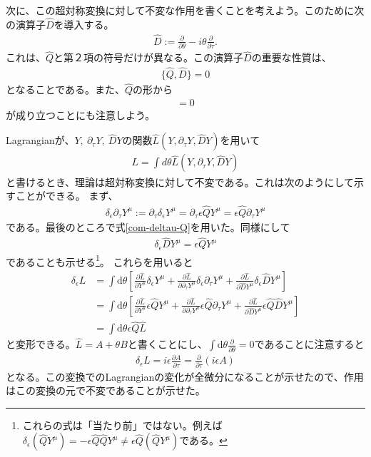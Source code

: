 \documentclass[report,paper=a4, fontsize=12pt, line_length=16cm, number_of_lines=33,dvipdfmx]{jlreq}
\numberwithin{equation}{chapter}
\numberwithin{equation}{section}
\newcommand{\del}{\partial}
\newcommand{\deldel}[2]{\frac{\del {#1}}{\del {#2}}}
\newcommand{\Qh}{\widehat{Q}}
\newcommand{\Dh}{\widehat{D}}
\newcommand{\Lh}{\widehat{L}}
\newcommand{\di}{\mathrm{d}}
\begin{document}
次に、この超対称変換に対して不変な作用を書くことを考えよう。このために次の演算子$\Dh$を導入する。
\begin{align}
\Dh:=\deldel{}{\theta}-i\theta\deldel{}{\tau}.
\end{align}
これは、$\Qh$と第２項の符号だけが異なる。この演算子$\Dh$の重要な性質は、
\begin{align}
\{\Qh,\Dh\}=0 \label{com-Q-D}
\end{align}
となることである。また、$\Qh$の形から
\begin{align}
[\del_{\tau},\Qh]=0\label{com-deltau-Q}
\end{align}
が成り立つことにも注意しよう。

Lagrangianが、$Y,\ \del_{\tau}Y,\ \Dh Y$の関数$\Lh(Y,\del_{\tau}Y,\Dh Y)$を用いて
\begin{align}
L=\int d\theta \Lh(Y,\del_{\tau}Y,\Dh Y)
\end{align}
と書けるとき、理論は超対称変換に対して不変である。これは次のようにして示すことができる。
まず、
\begin{align}
\delta_{\epsilon} \del_{\tau} Y^{\mu}:=
\del_{\tau}\delta_{\epsilon}Y^{\mu}
=\del_{\tau}\epsilon \Qh Y^{\mu}
=\epsilon \Qh \del_{\tau} Y^{\mu}
\end{align}
である。最後のところで式\eqref{com-deltau-Q}を用いた。同様にして
\begin{align}
\delta_{\epsilon} \Dh Y^{\mu}=\epsilon \Qh Y^{\mu}
\end{align}
であることも示せる\footnote{これらの式は「当たり前」ではない。例えば$\delta_{\epsilon} (\Qh Y^{\mu})=- \epsilon \Qh \Qh Y^{\mu}
\ne\epsilon \Qh (\Qh Y^{\mu})
$である。}。
これらを用いると
\begin{align}
\delta_{\epsilon} L
&=\int \di \theta 
\left[\deldel{\Lh}{Y^{\mu}}\delta_{\epsilon} Y^{\mu}
+\deldel{\Lh}{\del_{\tau} Y^{\mu}}\delta_{\epsilon} \del_{\tau} Y^{\mu}
+\deldel{\Lh}{\Dh Y^{\mu}}\delta_{\epsilon} \Dh Y^{\mu}
\right]\nonumber\\
&=\int \di \theta 
\left[\deldel{\Lh}{Y^{\mu}}\epsilon\Qh Y^{\mu}
+\deldel{\Lh}{\del_{\tau} Y^{\mu}}\epsilon\Qh \del_{\tau} Y^{\mu}
+\deldel{\Lh}{\Dh Y^{\mu}}\epsilon\Qh \Dh Y^{\mu}
\right]\nonumber\\
&=\int \di \theta \epsilon \Qh \Lh
\end{align}
と変形できる。$\Lh=A+\theta B$と書くことにし、$\int \di \theta \deldel{}{\theta}=0$であることに注意すると
\begin{align}
\delta_{\epsilon} L=i\epsilon \deldel{A}{\tau}
=\deldel{}{\tau}(i\epsilon A)
\end{align}
となる。この変換でのLagrangianの変化が全微分になることが示せたので、作用はこの変換の元で不変であることが示せた。
\end{document}
